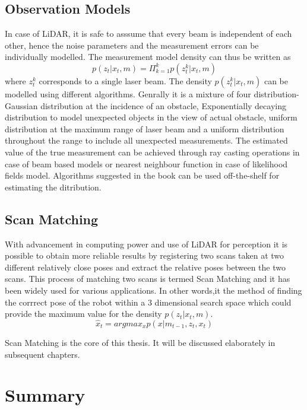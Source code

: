 \subsection{Observation Models}
In case of LiDAR, it is safe to asssume that every beam is independent of each other, hence the noise parameters and the measurement errors can be individually modelled. The measurement model density can
thus be written as 
\begin{equation}
    p(z_t | x_t, m)  = \Pi_{k=1}^k  p(z_t^k | x_t, m)
\end{equation}
where  $z_t^k$ corresponds to a single laser beam. The density $p(z_t^k | x_t, m)$ can be modelled using different algorithms. Genrally it is a mixture of four distribution- Gaussian distribution at the incidence of an obstacle, 
Exponentially decaying distribution to model unexpected objects in the view of actual obstacle, uniform distribution at the maximum range of laser beam and a uniform distribution throughout the range to include all unexpected measurements.
The estimated value of the true measurement can be achieved through ray casting operations in case of beam based models or nearest neighbour function in case of likelihood fields model.
Algorithms suggested in the book \cite{Thrun98aprobabilistic} can be used off-the-shelf for estimating the ditribution.

\subsection{Scan Matching}
    With advancement in computing power and use of
LiDAR for perception it is possible to obtain more reliable results by registering two scans taken at two different relatively close poses and extract the relative poses between the two scans. 
This process of matching two scans is termed Scan Matching and it has been widely used for various applications. In other words,it the method of finding the corrrect pose of the robot within a 3 dimensional
search space which could provide the maximum value for the density $p(z_t | x_t, m)$. 
\begin{equation}
    \hat{x} _{t} = argmax_{x} p(x|m_{t-1}, z_t, x_t)
\end{equation}
\par
Scan Matching is the core of this thesis. It will be discussed elaborately in subsequent chapters.

\section{Summary}